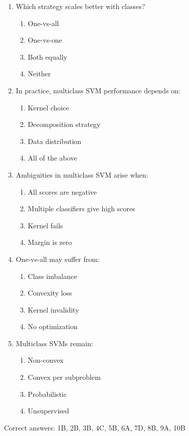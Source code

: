 \documentclass{article}
\begin{document}
\begin{enumerate}
		\item Which strategy scales better with classes?
		\begin{enumerate}
			\item One-vs-all
			\item One-vs-one
			\item Both equally
			\item Neither
		\end{enumerate}
		
		\item In practice, multiclass SVM performance depends on:
		\begin{enumerate}
			\item Kernel choice
			\item Decomposition strategy
			\item Data distribution
			\item All of the above
		\end{enumerate}
		
		\item Ambiguities in multiclass SVM arise when:
		\begin{enumerate}
			\item All scores are negative
			\item Multiple classifiers give high scores
			\item Kernel fails
			\item Margin is zero
		\end{enumerate}
		
		\item One-vs-all may suffer from:
		\begin{enumerate}
			\item Class imbalance
			\item Convexity loss
			\item Kernel invalidity
			\item No optimization
		\end{enumerate}
		
		\item Multiclass SVMs remain:
		\begin{enumerate}
			\item Non-convex
			\item Convex per subproblem
			\item Probabilistic
			\item Unsupervised
		\end{enumerate}
	\end{enumerate}
	
	Correct answers: 1B, 2B, 3B, 4C, 5B, 6A, 7D, 8B, 9A, 10B
	
\end{document}
